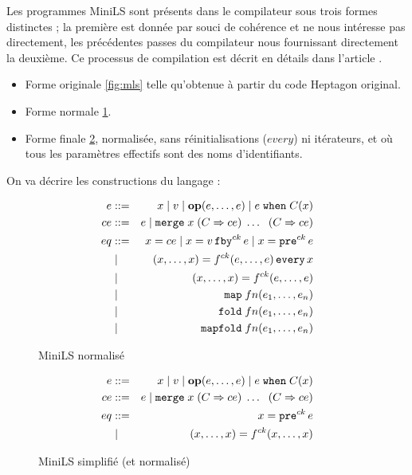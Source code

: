 \documentclass[a4paper]{article}
\newcommand{\LANG}{Heptagon}
\newcommand{\p}[0]{\; \vert \;}
\newcommand{\mybox}[1]{\mbox{\tt{#1}}}
\newcommand{\Coloneqq}[0]{::=}
\newcommand{\Op}[2]{\mybox{\bf{op}}(#1,\dots,#2)}
\newcommand{\Fby}[2]{#1 \, \mybox{fby}^{ck} \, #2}
\newcommand{\Pre}[1]{\mybox{pre}^{ck} \, #1}
\newcommand{\Every}[4]{#1^{ck}(#2,\dots,#3) \, \mybox{every} \, #4}
\newcommand{\App}[2]{#1^{ck}(#2)}
\newcommand{\When}[3]{#1 \; \mybox{when} \; #2(#3)}
\newcommand{\Merge}[5]{\mybox{merge} \; #1 \; (#2 \Rightarrow #3) \; \dots \; \
  (#4 \Rightarrow #5)}
\newcommand{\Map}[3]{\mathtt{map} \; #1 n (#2,\dots,#3)}
\newcommand{\Fold}[3]{\mathtt{fold} \; #1 n (#2,\dots,#3)}
\newcommand{\Mapfold}[3]{\mathtt{mapfold} \; #1 n (#2,\dots,#3)}
\begin{document}
Les programmes MiniLS sont pr\'esents dans le compilateur sous trois formes
distinctes ; la premi\`ere est donn\'ee par souci de coh\'erence et ne nous int\'eresse
pas directement, les pr\'ec\'edentes passes du compilateur nous fournissant
directement la deuxi\`eme. Ce processus de compilation est d\'ecrit en d\'etails dans
l'article \cite{lctes08a}.

\begin{itemize}
\item Forme originale \ref{fig:mls} telle qu'obtenue \`a partir du code \LANG{}
  original.
\item Forme normale \ref{fig:mlsn}.
\item Forme finale \ref{fig:mlsns}, normalis\'ee, sans r\'einitialisations ($every$)
  ni it\'erateurs, et o\`u tous les param\`etres effectifs sont des noms
  d'identifiants.
\end{itemize}

On va d\'ecrire les constructions du langage :

\begin{figure}[htp]
  \centering
  \begin{eqnarray*}
    e & \Coloneqq & x \p v \p \Op{e}{e} \p \When{e}{C}{x} \\
    ce & \Coloneqq & e \p \Merge{x}{C}{ce}{C}{ce} \\
    eq & \Coloneqq & x = ce \p x = \Fby{v}{e} \p x = \Pre{e} \\
    & \p & (x,\dots,x) = \Every{f}{e}{e}{x} \\
    & \p & (x,\dots,x) = \App{f}{e,\dots,e} \\
    & \p & \Map{f}{e_1}{e_n} \\
    & \p & \Fold{f}{e_1}{e_n} \\
    & \p & \Mapfold{f}{e_1}{e_n}
  \end{eqnarray*}
  \caption{MiniLS normalis\'e}
  \label{fig:mlsn}
\end{figure}

\begin{figure}[htp]
  \centering
  \begin{eqnarray*}
    e & \Coloneqq & x \p v \p \Op{e}{e} \p \When{e}{C}{x} \\
    ce & \Coloneqq & e \p \Merge{x}{C}{ce}{C}{ce} \\
    eq & \Coloneqq & x = \Pre{e} \\
    & \p & (x,\dots,x) = \App{f}{x,\dots,x}
  \end{eqnarray*}
  \caption{MiniLS simplifi\'e (et normalis\'e)}
  \label{fig:mlsns}
\end{figure}
\end{document}
